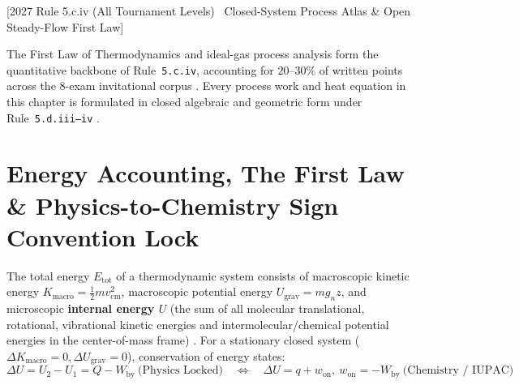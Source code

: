 [2027 Rule 5.c.iv (All Tournament Levels) \textbar\ Closed-System Process Atlas \& Open Steady-Flow First Law]


The First Law of Thermodynamics and ideal-gas process analysis form the quantitative backbone of Rule~\texttt{5.c.iv}, accounting for $20\text{--}30\%$ of written points across the 8-exam invitational corpus . Every process work and heat equation in this chapter is formulated in closed algebraic and geometric form under Rule~\texttt{5.d.iii--iv} .

\section{Energy Accounting, The First Law \& Physics-to-Chemistry Sign Convention Lock}\label{sec:07.1}

The total energy $E_{\mathrm{tot}}$ of a thermodynamic system consists of macroscopic kinetic energy $K_{\mathrm{macro}} = \frac{1}{2}mv_{\mathrm{cm}}^2$, macroscopic potential energy $U_{\mathrm{grav}} = mg_n z$, and microscopic \textbf{internal energy $U$} (the sum of all molecular translational, rotational, vibrational kinetic energies and intermolecular/chemical potential energies in the center-of-mass frame) . For a stationary closed system ($\Delta K_{\mathrm{macro}} = 0, \Delta U_{\mathrm{grav}} = 0$), conservation of energy states:
\begin{equation}\label{eq:07:first-law}
  \boxed{\Delta U = U_2 - U_1 = Q - W_{\mathrm{by}}} \ \text{(Physics Locked)} \quad \Longleftrightarrow \quad \boxed{\Delta U = q + w_{\mathrm{on}}, \ w_{\mathrm{on}} = -W_{\mathrm{by}}} \ \text{(Chemistry / IUPAC)}
\end{equation}

